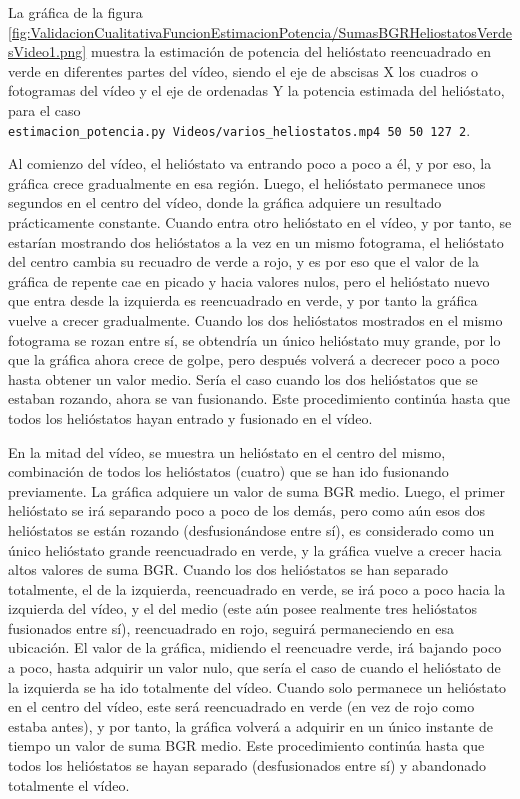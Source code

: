 La gráfica de la figura \ref{fig:ValidacionCualitativaFuncionEstimacionPotencia/SumasBGRHeliostatosVerdesVideo1.png} muestra la estimación de potencia del helióstato reencuadrado en verde en diferentes partes del vídeo, siendo el eje de abscisas X los cuadros o fotogramas del vídeo y el eje de ordenadas Y la potencia estimada del helióstato, para el caso\\ \verb|estimacion_potencia.py Videos/varios_heliostatos.mp4 50 50 127 2|.

Al comienzo del vídeo, el helióstato va entrando poco a poco a él, y por eso, la gráfica crece gradualmente en esa región. Luego, el helióstato permanece unos segundos en el centro del vídeo, donde la gráfica adquiere un resultado prácticamente constante. Cuando entra otro helióstato en el vídeo, y por tanto, se estarían mostrando dos helióstatos a la vez en un mismo fotograma, el helióstato del centro cambia su recuadro de verde a rojo, y es por eso que el valor de la gráfica de repente cae en picado y hacia valores nulos, pero el helióstato nuevo que entra desde la izquierda es reencuadrado en verde, y por tanto la gráfica vuelve a crecer gradualmente. Cuando los dos helióstatos mostrados en el mismo fotograma se rozan entre sí, se obtendría un único helióstato muy grande, por lo que la gráfica ahora crece de golpe, pero después volverá a decrecer poco a poco hasta obtener un valor medio. Sería el caso cuando los dos helióstatos que se estaban rozando, ahora se van fusionando. Este procedimiento continúa hasta que todos los helióstatos hayan entrado y fusionado en el vídeo.

En la mitad del vídeo, se muestra un helióstato en el centro del mismo, combinación de todos los helióstatos (cuatro) que se han ido fusionando previamente. La gráfica adquiere un valor de suma BGR medio. Luego, el primer helióstato se irá separando poco a poco de los demás, pero como aún esos dos helióstatos se están rozando (desfusionándose entre sí), es considerado como un único helióstato grande reencuadrado en verde, y la gráfica vuelve a crecer hacia altos valores de suma BGR. Cuando los dos helióstatos se han separado totalmente, el de la izquierda, reencuadrado en verde, se irá poco a poco hacia la izquierda del vídeo, y el del medio (este aún posee realmente tres helióstatos fusionados entre sí), reencuadrado en rojo, seguirá permaneciendo en esa ubicación. El valor de la gráfica, midiendo el reencuadre verde, irá bajando poco a poco, hasta adquirir un valor nulo, que sería el caso de cuando el helióstato de la izquierda se ha ido totalmente del vídeo. Cuando solo permanece un helióstato en el centro del vídeo, este será reencuadrado en verde (en vez de rojo como estaba antes), y por tanto, la gráfica volverá a adquirir en un único instante de tiempo un valor de suma BGR medio. Este procedimiento continúa hasta que todos los helióstatos se hayan separado (desfusionados entre sí) y abandonado totalmente el vídeo.

